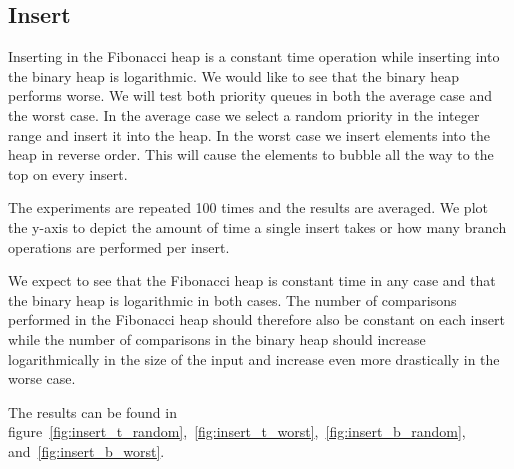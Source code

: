 \documentclass[a4paper,oneside,article,11pt]{memoir}
\begin{document}
\subsection{Insert}
Inserting in the Fibonacci heap is a constant time operation while inserting into the binary heap is logarithmic. We would like to see that the binary heap performs worse. We will test both priority queues in both the average case and the worst case. In the average case we select a random priority in the integer range and insert it into the heap.
In the worst case we insert elements into the heap in reverse order. This will cause the elements to bubble all the way to the top on every insert.

The experiments are repeated 100 times and the results are averaged. We plot the y-axis to depict the amount of time a single insert takes or how many branch operations are performed per insert.

We expect to see that the Fibonacci heap is constant time in any case and that the binary heap is logarithmic in both cases. The number of comparisons performed in the Fibonacci heap should therefore also be constant on each insert while the number of comparisons in the binary heap should increase logarithmically in the size of the input and increase even more drastically in the worse case.

The results can be found in figure~\ref{fig:insert_t_random},~\ref{fig:insert_t_worst},~\ref{fig:insert_b_random}, and~\ref{fig:insert_b_worst}.
\end{document}
